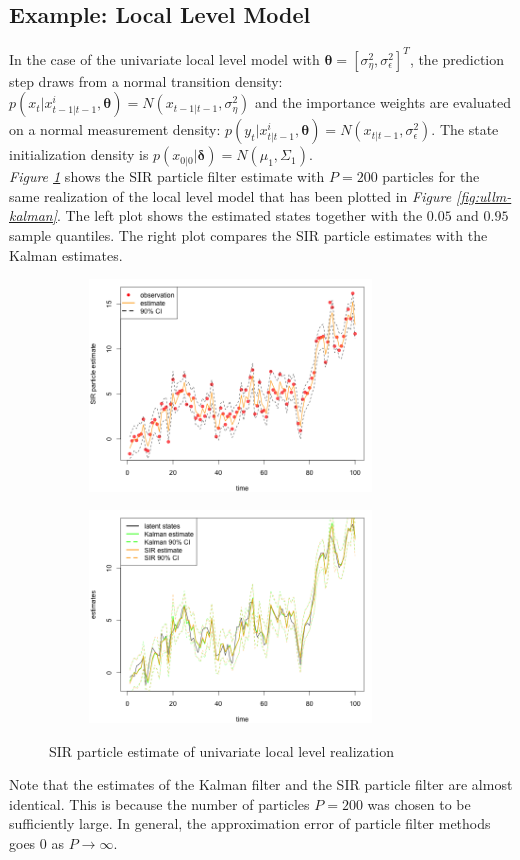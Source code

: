 \documentclass[11pt, oneside]{scrreprt}   	%
\begin{document}
\subsection{Example: Local Level Model}
In the case of the univariate local level model with $\boldsymbol{\theta}=[\sigma_{\eta}^2, \sigma_{\epsilon}^2]^T$, the prediction step draws from a normal transition density: $p(x_t | x_{t-1 | t-1}^i, \boldsymbol{\theta}) = N(x_{t-1 | t-1}, \sigma_{\eta}^2)$ and the importance weights are evaluated on a normal measurement density: $p(y_t | x_{t | t-1}^i, \boldsymbol{\theta}) = N(x_{t | t-1}, \sigma_{\epsilon}^2)$. The state initialization density is $p(x_{0 | 0 } | \boldsymbol{\delta}) = N(\mu_1, \Sigma_1)$.\\

\textit{Figure \ref{fig:ullm-particle}} shows the SIR particle filter estimate with $P=200$ particles for the same realization of the local level model that has been plotted in \textit{Figure \ref{fig:ullm-kalman}}. The left plot shows the estimated states together with the $0.05$ and $0.95$ sample quantiles. The right plot compares the SIR particle estimates with the Kalman estimates. 
\begin{figure}[h!]
\centering
\begin{subfigure}{.5\textwidth}
  \centering
  \includegraphics[width=75mm]{../../images/ullm-estimate-particle.png}
\end{subfigure}%
\begin{subfigure}{.5\textwidth}
  \centering
  \includegraphics[width=75mm]{../../images/ullm-filter-comparison.png}
\end{subfigure}
\caption{SIR particle estimate of univariate local level realization}
\label{fig:ullm-particle}
\end{figure}
Note that the estimates of the Kalman filter and the SIR particle filter are almost identical. 
This is because the number of particles $P=200$ was chosen to be sufficiently large. 
In general, the approximation error of particle filter methods goes $0$ as $P \to \infty$.
\end{document}
